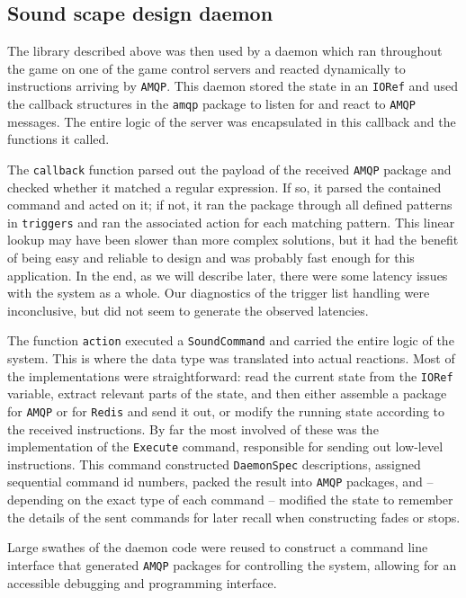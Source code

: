 \subsection{Sound scape design daemon}
\label{sec:sound-scape-design}

The library described above was then used by a daemon which ran
throughout the game on one of the game control servers and reacted
dynamically to instructions arriving by \texttt{AMQP}. This daemon stored
the state in an
\texttt{IORef} and used the
callback structures in the \texttt{amqp} package to listen for and
react to \texttt{AMQP} messages. The entire logic of the server was encapsulated
in this callback and the functions it called.

The \texttt{callback} function parsed out the payload of the received \texttt{AMQP}
package and checked whether it matched a regular expression. If so, it parsed the contained command and acted on it; if not, it ran
the package through all defined patterns in \texttt{triggers} and ran
the associated action for each matching pattern. This linear lookup
may have been slower than more complex solutions, but it had the benefit
of being easy and reliable to design and was probably fast
enough for this application. In the end, as we will describe later,
there were some latency issues with the system as a whole. Our
diagnostics of the trigger list handling were inconclusive, but did
not seem to generate the observed latencies.

The function \texttt{action} executed a \texttt{SoundCommand} and
carried the entire logic of the system. This is where the data type was
translated into actual reactions. Most of the implementations were
straightforward: read the current state from the \texttt{IORef}
variable, extract relevant parts of the state, and then either assemble a package for
\texttt{AMQP} or for \texttt{Redis} and send it out, or modify the running state
according to the received instructions. By far the most involved of
these was the implementation of the \texttt{Execute} command,
responsible for sending out low-level instructions. This command constructed
\texttt{DaemonSpec} descriptions, assigned sequential command id
numbers, packed the result into \texttt{AMQP} packages, and -- depending on the
exact type of each command -- modified the state to remember the details
of the sent commands for later recall when constructing fades or
stops.

Large swathes of the daemon code were reused to construct a command
line interface that generated \texttt{AMQP} packages for controlling the
system, allowing for an accessible debugging and programming interface.


